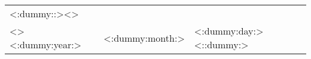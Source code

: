 \documentclass[10pt,a4paper]{article}
\begin{document}
	\begin{tabular}{lll}<:dummy::><>\\<>
		<:dummy:year:> & <:dummy:month:> & <:dummy:day:><::dummy:>
	\end{tabular}
\end{document}
